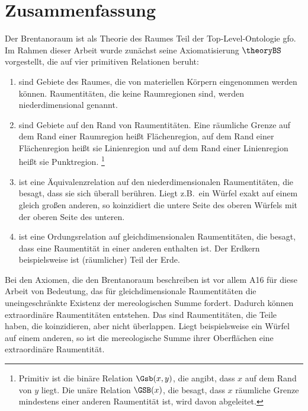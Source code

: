     \section{Zusammenfassung}
    Der
    Brentanoraum ist als Theorie des Raumes Teil der Top-Level-Ontologie \ac{gfo}.
    Im Rahmen dieser Arbeit wurde zunächst seine Axiomatisierung $\theoryBS$ vorgestellt,
    die auf vier primitiven Relationen beruht:
    \begin{enumerate}
        \item {} 
            sind Gebiete des Raumes, die von materiellen Körpern eingenommen werden können.
            Raumentitäten, die keine Raumregionen sind, werden niederdimensional genannt.
        \item {} 
            sind Gebiete auf den Rand von Raumentitäten. 
            Eine räumliche Grenze auf dem Rand einer Raumregion heißt Flächenregion, auf dem Rand einer Flächenregion heißt sie Linienregion und auf dem Rand einer Linienregion heißt sie Punktregion.%
            \footnote{
                Primitiv ist die binäre Relation $\Gsb(x,y)$, die angibt, dass $x$ auf dem Rand von $y$ liegt.
                Die unäre Relation $\GSB(x)$, die besagt, dass $x$ räumliche Grenze mindestens einer anderen Raumentität ist, wird davon abgeleitet.
            }
        \item {}
            ist eine Äquivalenzrelation auf den niederdimensionalen Raumentitäten, die besagt, dass sie sich überall berühren.
            Liegt z.B.\ ein Würfel exakt auf einem gleich großen anderen, so koinzidiert die untere Seite des oberen Würfels mit der oberen Seite des unteren.
        \item {}
            ist eine Ordungsrelation auf gleichdimensionalen Raumentitäten, die besagt, dass eine Raumentität in einer anderen enthalten ist.
            Der Erdkern beispielsweise ist (räumlicher) Teil der Erde.
    \end{enumerate}
%
    Bei
    den Axiomen, die den Brentanoraum beschreiben ist vor allem A16 für diese Arbeit von Bedeutung, das für gleichdimensionale Raumentitäten die uneingeschränkte Existenz der mereologischen Summe fordert.
    Dadurch können extraordinäre Raumentitäten entstehen. 
    Das sind Raumentitäten, die Teile haben, die koinzidieren, aber nicht überlappen.
    Liegt beispielsweise ein Würfel auf einem anderen, so ist die mereologische Summe ihrer Oberflächen eine extraordinäre Raumentität.
    

